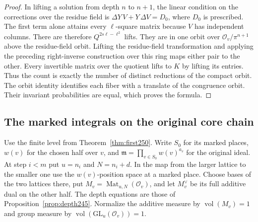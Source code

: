 \documentclass[a4paper,11pt]{article}
\theoremstyle{definition}
\theoremstyle{remark}
\numberwithin{equation}{section}
\begin{document}
\begin{proof}
In lifting a solution from depth \(n\) to \(n+1\), the linear
condition on the corrections over the residue field is
\(\Delta Y\,V+Y\,\Delta V=D_0\), where \(D_0\) is prescribed.
The first term alone attains every \(\ell\)-square matrix
because \(V\) has independent columns. There are therefore
\(Q^{2s\ell-\ell^2}\) lifts. They are in one orbit over
\(\mathcal O_v/\pi^{n+1}\) above the residue-field orbit.
Lifting the residue-field transformation and applying the preceding
right-inverse construction over this ring maps either pair to
the other. Every invertible matrix over the quotient lifts to \(K\)
by lifting its entries. Thus the count is exactly the number
of distinct reductions of the compact orbit. The orbit
identity identifies each fiber with a translate of the
congruence orbit. Their invariant probabilities are equal,
which proves the formula.
\end{proof}

\subsection{The marked integrals on the original core chain}\label{nav:IX-36}
Use the finite level from Theorem~\ref{thm:first250}. Write \(S_0\)
for its marked places, \(w(v)\) for the chosen half over \(v\), and
\(\mathfrak m=\prod_{v\in S_0}w(v)^{a_v}\) for the original ideal.
At step \(i<m\) put \(u=n_i\) and \(N=n_i+d\).
In the map from the larger lattice to the smaller one use the
\(w(v)\)-position space at a marked place. Choose bases of the two
lattices there, put \(M_v=\operatorname{Mat}_{u,N}(\mathcal O_v)\),
and let \(M_v^\vee\) be its full additive dual on the other half.
The depth equations are those of Proposition~\ref{prop:depth245}.
Normalize the additive measure by \(\operatorname{vol}(M_v)=1\)
and group measure by
\(\operatorname{vol}(\mathrm{GL}_u(\mathcal O_v))=1\).
\end{document}
